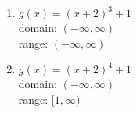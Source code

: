 \documentclass{ximera}
\begin{document}
\begin{enumerate}
\setcounter{enumi}{\value{HW}}

\item $g(x) = (x + 2)^{3} + 1$ \\ 
domain: $(-\infty, \infty)$ \\ 
range: $(-\infty, \infty)$ \\

%

\vfill


\item $g(x) = (x + 2)^{4} + 1$\\
domain: $(-\infty, \infty)$\\
range: $[1, \infty)$\\

%

\setcounter{HW}{\value{enumi}}
\end{enumerate}
\end{document}
